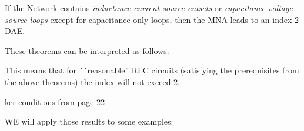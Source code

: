 \begin{theorem} \cite{Tischendorf2004Topological}
	If the Network contains \emph{inductance-current-source cutsets} or \emph{capacitance-voltage-source loops} except for capacitance-only loops, then the MNA leads to an index-2 DAE.
\end{theorem}

These theorems can be interpreted as follows:


This means that for ´´reasonable'' RLC circuits (satisfying the prerequisites from the above theorems) the index will not exceed 2.


ker conditions from page 22

WE will apply those results to some examples: